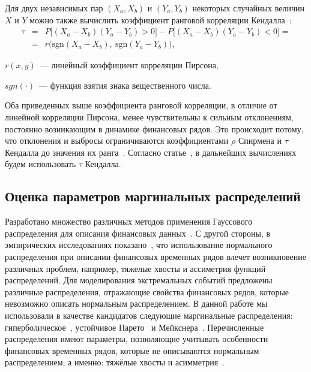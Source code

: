 Для двух независимых пар $(X_a, X_b)$ и $(Y_a, Y_b)$ некоторых случайных величин $X$ и $Y$ можно также вычислить коэффициент ранговой корреляции Кендалла~\cite{Kendall1970}:
\begin{eqnarray}\label{kendall}
\tau &=& P\big[(X_a-X_b)(Y_a-Y_b)>0\big]-P\big[(X_a-X_b)(Y_a-Y_b)<0\big] = \\ 
&=& r\big(\text{sgn}(X_a-X_b),~\text{sgn}(Y_a-Y_b)\big),\nonumber
\end{eqnarray}
\begin{where}
    \item $r(x,y)$~--- линейный коэффициент корреляции Пирсона,
    \item $sgn(\cdot)$~--- функция взятия знака вещественного числа.
\end{where}

Оба приведенных выше коэффициента ранговой корреляции, в отличие от линейной корреляции Пирсона, менее чувствительны к сильным отклонениям, постоянно возникающим в динамике финансовых рядов.
Это происходит потому, что отклонения и выбросы ограничиваются коэффициентами $\rho$ Спирмена и $\tau$ Кендалла до значения их ранга~\cite{Ane2003}.
Согласно статье~\cite{Dissmann2013}, в дальнейших вычислениях будем использовать $\tau$ Кендалла.

\subsection{Оценка параметров маргинальных распределений}
\label{methodology:marginals}

Разработано множество различных методов применения Гауссового распределения для описания финансовых данных~\cite{Json1949}. 
С другой стороны, в эмпирических исследованиях показано~\cite{Limp2011, Rachev2005, Wilmott2007}, что использование нормального распределения при описании финансовых временных рядов влечет возникновение различных проблем, например, тяжелые хвосты и ассиметрия функций распределений.
Для моделирования экстремальных событий предложены различные распределения, отражающие свойства финансовых рядов, которые невозможно описать нормальным распределением.
В данной работе мы использовали в качестве кандидатов следующие маргинальные распределения: гиперболическое~\cite{Barndoff1983}, устойчивое Парето~\cite{Nolan2009, Rachev2005, Stoyanov2013} и Мейкснера~\cite{Schoutens2002}. Перечисленные распределения имеют параметры, позволяющие учитывать особенности  финансовых временных рядов, которые не описываются нормальным распределением, а именно: тяжёлые хвосты и асимметрия~\cite{Stoyanov2013}. 

